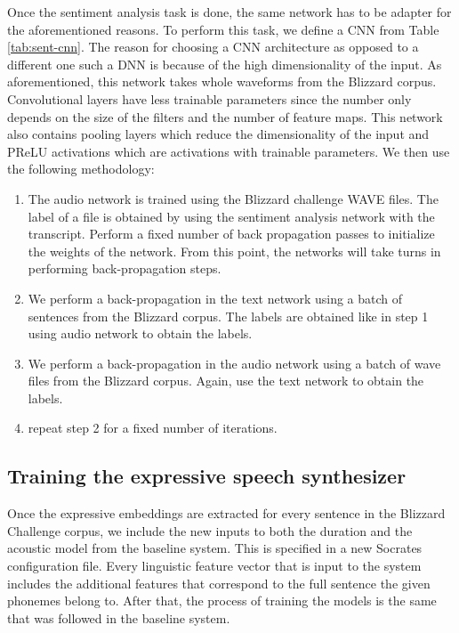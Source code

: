 Once the sentiment analysis task is done, the same network has to be adapter for the aforementioned reasons. To perform this task, we define a CNN from Table \ref{tab:sent-cnn}. The reason for choosing a CNN architecture as opposed to a different one such a DNN is because of the high dimensionality of the input. As aforementioned, this network takes whole waveforms from the Blizzard corpus. Convolutional layers have less trainable parameters since the number only depends on the size of the filters and the number of feature maps. This network also contains pooling layers which reduce the dimensionality of the input \cite{scherer2010evaluation} and PReLU activations \cite{xu2015empirical} which are activations with trainable parameters. We then use the following methodology:

\begin{enumerate}
    \item The audio network is trained using the Blizzard challenge WAVE files. The label of a file is obtained by using the sentiment analysis network with the transcript. Perform a fixed number of back propagation passes to initialize the weights of the network. From this point, the networks will take turns in performing back-propagation steps.
    \item We perform a back-propagation in the text network using a batch of sentences from the Blizzard corpus. The labels are obtained like in step 1 using audio network to obtain the labels.
    \item We perform a back-propagation in the audio network using a batch of wave files from the Blizzard corpus. Again, use the text network to obtain the labels.
    \item repeat step 2 for  a fixed number of iterations.
\end{enumerate}

\subsection{Training the expressive speech synthesizer}

Once the expressive embeddings are extracted for every sentence in the Blizzard Challenge corpus, we include the new inputs to both the duration and the acoustic model from the baseline system. This is specified in a new Socrates configuration file. Every linguistic feature vector that is input to the system includes the additional features that correspond to the full sentence the given phonemes belong to. After that, the process of training the models is the same that was followed in the baseline system.

